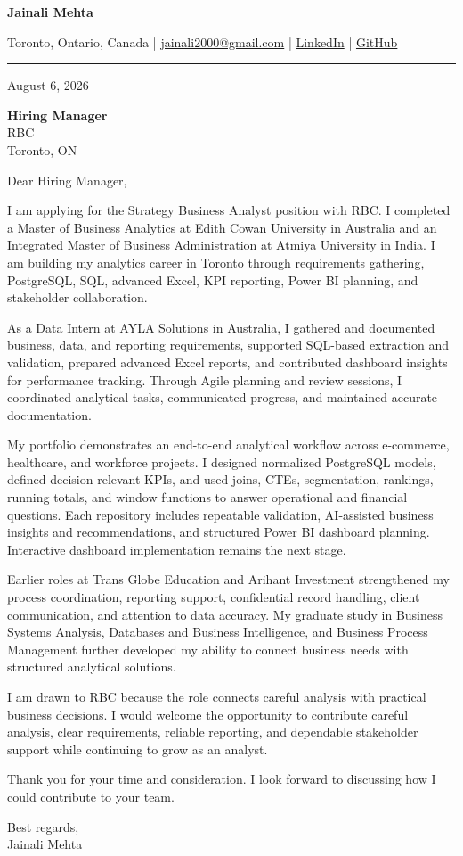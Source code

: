 \documentclass[letterpaper,10pt]{article}
\begin{document}
\begin{center}
  {\fontsize{17}{19}\selectfont\textbf{Jainali Mehta}}\par\vspace{2pt}
  \small Toronto, Ontario, Canada \;|\;
  \href{mailto:jainali2000@gmail.com}{jainali2000@gmail.com} \;|\;
  \href{https://www.linkedin.com/in/jainali-mehta}{LinkedIn} \;|\;
  \href{https://github.com/jainalimehta}{GitHub}
\end{center}
\vspace{-5pt}
\noindent\rule{\textwidth}{0.4pt}

August 6, 2026

\textbf{Hiring Manager}\\
RBC\\
Toronto, ON

Dear Hiring Manager,

I am applying for the Strategy Business Analyst position with RBC. I completed a Master of Business Analytics at Edith Cowan University in Australia and an Integrated Master of Business Administration at Atmiya University in India. I am building my analytics career in Toronto through requirements gathering, PostgreSQL, SQL, advanced Excel, KPI reporting, Power BI planning, and stakeholder collaboration.

As a Data Intern at AYLA Solutions in Australia, I gathered and documented business, data, and reporting requirements, supported SQL-based extraction and validation, prepared advanced Excel reports, and contributed dashboard insights for performance tracking. Through Agile planning and review sessions, I coordinated analytical tasks, communicated progress, and maintained accurate documentation.

My portfolio demonstrates an end-to-end analytical workflow across e-commerce, healthcare, and workforce projects. I designed normalized PostgreSQL models, defined decision-relevant KPIs, and used joins, CTEs, segmentation, rankings, running totals, and window functions to answer operational and financial questions. Each repository includes repeatable validation, AI-assisted business insights and recommendations, and structured Power BI dashboard planning. Interactive dashboard implementation remains the next stage.

Earlier roles at Trans Globe Education and Arihant Investment strengthened my process coordination, reporting support, confidential record handling, client communication, and attention to data accuracy. My graduate study in Business Systems Analysis, Databases and Business Intelligence, and Business Process Management further developed my ability to connect business needs with structured analytical solutions.

I am drawn to RBC because the role connects careful analysis with practical business decisions. I would welcome the opportunity to contribute careful analysis, clear requirements, reliable reporting, and dependable stakeholder support while continuing to grow as an analyst.

Thank you for your time and consideration. I look forward to discussing how I could contribute to your team.

Best regards,\\[8pt]
Jainali Mehta
\end{document}
